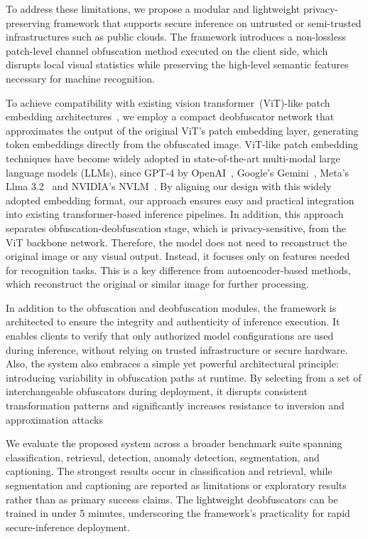 \documentclass{ieeeaccess}
\newcommand{\rev}[1]{{\color{green}#1}}
\begin{document}
To address these limitations, we propose a modular and lightweight privacy-preserving framework that supports secure inference on untrusted or semi-trusted infrastructures such as public clouds. \rev{The framework introduces a non-lossless patch-level channel obfuscation method executed on the client side, which disrupts local visual statistics while preserving the high-level semantic features necessary for machine recognition.}

To achieve compatibility with existing vision transformer~(ViT)-like patch embedding architectures~\cite{dosovitskiy2020vit}, we employ a compact deobfuscator network that approximates the output of the original ViT's patch embedding layer, generating token embeddings directly from the obfuscated image. ViT-like patch embedding techniques have become widely adopted in state-of-the-art multi-modal large language models (LLMs), since GPT-4 by OpenAI~\cite{2023GPT4VisionSC}, Google's Gemini~\cite{geminiteam2025geminifamilyhighlycapable}, Meta's Llma 3.2~\cite{meta2024llama3} and NVIDIA's NVLM~\cite{dai2024nvlmopenfrontierclassmultimodal}. By aligning our design with this widely adopted embedding format, our approach ensures easy and practical integration into existing transformer-based inference pipelines. In addition, this approach separates obfuscation-deobfuscation stage, which is privacy-sensitive, from the ViT backbone network. Therefore, the model does not need to reconstruct the original image or any visual output. Instead, it focuses only on features needed for recognition tasks. This is a key difference from autoencoder-based methods, which reconstruct the original or similar image for further processing.

In addition to the obfuscation and deobfuscation modules, the framework is architected to ensure the integrity and authenticity of inference execution. It enables clients to verify that only authorized model configurations are used during inference, without relying on trusted infrastructure or secure hardware. Also, the system also embraces a simple yet powerful architectural principle: introducing variability in obfuscation paths at runtime. By selecting from a set of interchangeable obfuscators during deployment, it disrupts consistent transformation patterns and significantly increases resistance to inversion and approximation attacks

\rev{We evaluate the proposed system across a broader benchmark suite spanning classification, retrieval, detection, anomaly detection, segmentation, and captioning. The strongest results occur in classification and retrieval, while segmentation and captioning are reported as limitations or exploratory results rather than as primary success claims. The lightweight deobfuscators can be trained in under 5 minutes, underscoring the framework's practicality for rapid secure-inference deployment.}
\end{document}
